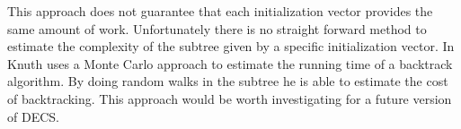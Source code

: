 This approach does not guarantee that each initialization vector provides the same amount of work.
Unfortunately there is no straight forward method to estimate the complexity of the subtree given by a specific initialization vector.
In \cite{knuth75backtracking} Knuth uses a Monte Carlo approach to estimate the running time of a backtrack algorithm.
By doing random walks in the subtree he is able to estimate the cost of backtracking.
This approach would be worth investigating for a future version of DECS.